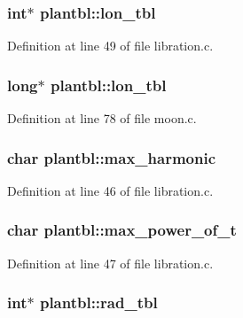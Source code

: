 \hypertarget{structplantbl_a893643004cfbecb46a1d3fd4b4857cd6}{
\subsubsection[{lon\-\_\-tbl}]{\setlength{\rightskip}{0pt plus 5cm}int$\ast$ plantbl\-::lon\-\_\-tbl}}\label{structplantbl_a893643004cfbecb46a1d3fd4b4857cd6}


Definition at line 49 of file libration.\-c.

\hypertarget{structplantbl_ad51a63fde0dbefd2581ff16c96f95230}{
\subsubsection[{lon\-\_\-tbl}]{\setlength{\rightskip}{0pt plus 5cm}long$\ast$ plantbl\-::lon\-\_\-tbl}}\label{structplantbl_ad51a63fde0dbefd2581ff16c96f95230}


Definition at line 78 of file moon.\-c.

\hypertarget{structplantbl_ac78decd8f4f44e8641dd629285f532ee}{
\subsubsection[{max\-\_\-harmonic}]{\setlength{\rightskip}{0pt plus 5cm}char plantbl\-::max\-\_\-harmonic}}\label{structplantbl_ac78decd8f4f44e8641dd629285f532ee}


Definition at line 46 of file libration.\-c.

\hypertarget{structplantbl_a9c423e6b1a2ef97627cf3f593379a5d6}{
\subsubsection[{max\-\_\-power\-\_\-of\-\_\-t}]{\setlength{\rightskip}{0pt plus 5cm}char plantbl\-::max\-\_\-power\-\_\-of\-\_\-t}}\label{structplantbl_a9c423e6b1a2ef97627cf3f593379a5d6}


Definition at line 47 of file libration.\-c.

\hypertarget{structplantbl_a0ff08cc01d8950876d32a2c7c577d186}{
\subsubsection[{rad\-\_\-tbl}]{\setlength{\rightskip}{0pt plus 5cm}int$\ast$ plantbl\-::rad\-\_\-tbl}}\label{structplantbl_a0ff08cc01d8950876d32a2c7c577d186}


